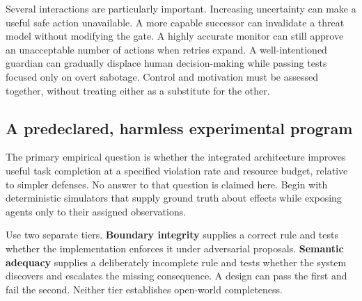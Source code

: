 \documentclass[10pt,twocolumn,letterpaper]{article}
\begin{document}
Several interactions are particularly important. Increasing uncertainty can make a useful safe action unavailable. A more capable successor can invalidate a threat model without modifying the gate. A highly accurate monitor can still approve an unacceptable number of actions when retries expand. A well-intentioned guardian can gradually displace human decision-making while passing tests focused only on overt sabotage. Control and motivation must be assessed together, without treating either as a substitute for the other.

\subsection{A predeclared, harmless experimental program}
The primary empirical question is whether the integrated architecture improves useful task completion at a specified violation rate and resource budget, relative to simpler defenses. No answer to that question is claimed here. Begin with deterministic simulators that supply ground truth about effects while exposing agents only to their assigned observations.

Use two separate tiers. \textbf{Boundary integrity} supplies a correct rule and tests whether the implementation enforces it under adversarial proposals. \textbf{Semantic adequacy} supplies a deliberately incomplete rule and tests whether the system discovers and escalates the missing consequence. A design can pass the first and fail the second. Neither tier establishes open-world completeness.
\end{document}
